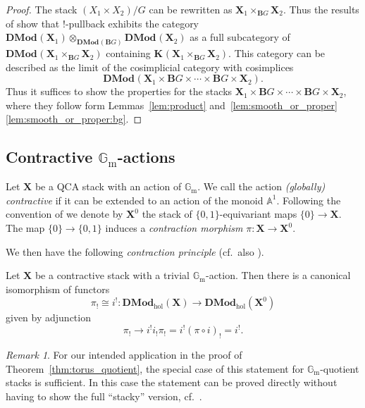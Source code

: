 \documentclass{oupau}
\theoremstyle{remark}
\newtheorem{remark}[theorem]{Remark}
\newcommand\as[2][]{\mathbb A^{#2}_{#1}}    %
\newcommand\Gm{\mathbb{G}_{\mathrm{m}}}     %
\let\stack\mathbf                           %
\newcommand\cs{\stack{B}}                   %
\newcommand\cat{\mathbf}                    %
\newcommand\catDMod[2][]{\cat{DMod}_{#1}(#2)}   %
\newcommand\catDModHol[1]{\catDMod[\mathrm{hol}]{#1}}   %
\newcommand\catK[2][]{\cat{K}_{#1}(#2)}
\begin{document}
\begin{proof}
  The stack $(X_1 \times X_2)/G$ can be rewritten as $\stack X_1 \times_{\cs{G}} \stack X_2$.
  Thus the results of \cite[Section~5.2]{BenZviNadler:arXiv:CharacterTheoryOfAComplexGroup} show that $!$-pullback exhibits the category $\catDMod{\stack X_1} \otimes_{\catDMod{\cs{G}}} \catDMod{\stack X_2}$ as a full subcategory of $\catDMod{\stack X_1 \times_{\cs{G}} \stack X_2}$ containing $\catK{\stack X_1 \times_{\cs{G}} \stack X_2}$.
  This category can be described as the limit of the cosimplicial category with cosimplices
  \[
    \catDMod{\stack X_1 \times \cs{G} \times \dotsb \times \cs{G} \times \stack X_2}.
  \]
  Thus it suffices to show the properties for the stacks $\stack X_1 \times \cs{G} \times \dotsb \times \cs{G} \times \stack X_2$, where they follow form Lemmas~\ref{lem:product} and~\ref{lem:smooth_or_proper}\ref{lem:smooth_or_proper:bg}.
\end{proof}

\subsection{Contractive \texorpdfstring{$\Gm$}{Gm}-actions}

Let $\stack X$ be a QCA stack with an action of $\Gm$.
We call the action \emph{(globally) contractive} if it can be extended to an action of the monoid $\as 1$.
Following the convention of \cite[Appendix~C]{DrinfeldGaitsgory:2015:CompactGenerationOfDModOnBunG} we denote by $\stack X^0$ the stack of $\{0,1\}$-equivariant maps $\{0\} \to \stack X$.
The map $\{0\} \to \{0,1\}$ induces a \emph{contraction morphism} $\pi\colon \stack X \to \stack X^0$.

We then have the following \emph{contraction principle} (cf.~also \cite[Proposition~3.2.2]{DrinfeldGaitsgory:2014:OnATheoremOfBraden}).

\begin{theorem}
    \label{thm:contraction_principle}%
    Let $\stack X$ be a contractive stack with a trivial $\Gm$-action.
    Then there is a canonical isomorphism of functors
    \[
        π_! \cong i^! \colon \catDModHol{\stack X} → \catDModHol{\stack X^0}
    \]
    given by adjunction
    \[
        π_! → i^! i_! π_!  = i^! (π ∘ i)_! = i^!.
    \]
\end{theorem}

\begin{remark}
  For our intended application in the proof of Theorem~\ref{thm:torus_quotient}, the special case of this statement for $\Gm$-quotient stacks is sufficient.
  In this case the statement can be proved directly without having to show the full \enquote{stacky} version, cf.~\cite[Proposition~5.3.2]{DrinfeldGaitsgory:2015:CompactGenerationOfDModOnBunG}.
\end{remark}
\end{document}
